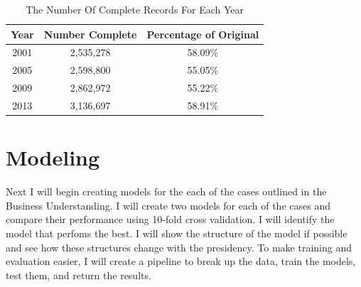 \documentclass{article}
\begin{document}
    \begin{center}
        \begin{table}
            \centering
            \begin{tabular}{ |c|c|c| }
                \hline
                Year & Number Complete & Percentage of Original \\
                \hline
                2001 & 2,535,278 & 58.09\% \\
                2005 & 2,598,800 & 55.05\% \\
                2009 & 2,862,972 & 55.22\% \\
                2013 & 3,136,697 & 58.91\% \\
                \hline
            \end{tabular}
            \caption{The Number Of Complete Records For Each Year}
            \label{tab:6}
        \end{table}
    \end{center}

\section{Modeling}
Next I will begin creating models for the each of the cases outlined in the Business Understanding. I will create two models for each of the cases and compare their performance using 10-fold cross validation. I will identify the model that perfoms the best. I will show the structure of the model if possible and see how these structures change with the presidency. To make training and evaluation easier, I will create a pipeline to break up the data, train the models, test them, and return the results.
\end{document}
